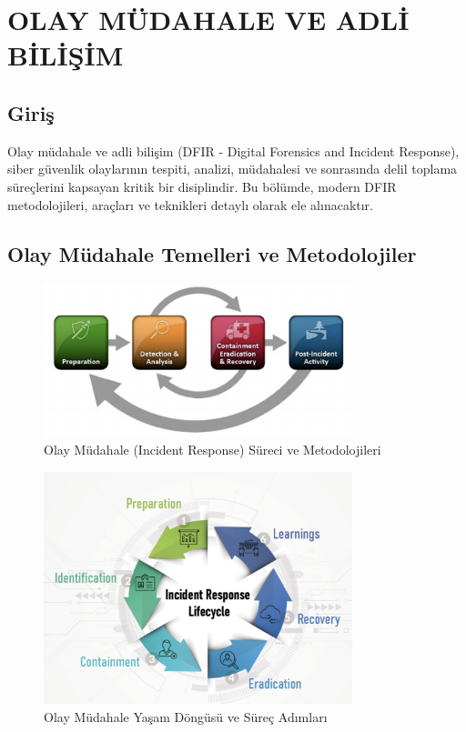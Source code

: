 \chapter{OLAY MÜDAHALE VE ADLİ BİLİŞİM}

\section*{Giriş}
Olay müdahale ve adli bilişim (DFIR - Digital Forensics and Incident Response), siber güvenlik olaylarının tespiti, analizi, müdahalesi ve sonrasında delil toplama süreçlerini kapsayan kritik bir disiplindir. Bu bölümde, modern DFIR metodolojileri, araçları ve teknikleri detaylı olarak ele alınacaktır.



\section{Olay Müdahale Temelleri ve Metodolojiler}

\begin{figure}[H]
    \centering
    \includegraphics[width=0.8\textwidth]{img/IR.png}
    \caption{Olay Müdahale (Incident Response) Süreci ve Metodolojileri}
    \label{fig:incident-response}
\end{figure}

\begin{figure}[H]
    \centering
    \includegraphics[width=0.8\textwidth]{img/IR_lifecycle.png}
    \caption{Olay Müdahale Yaşam Döngüsü ve Süreç Adımları}
    \label{fig:ir-lifecycle}
\end{figure}



